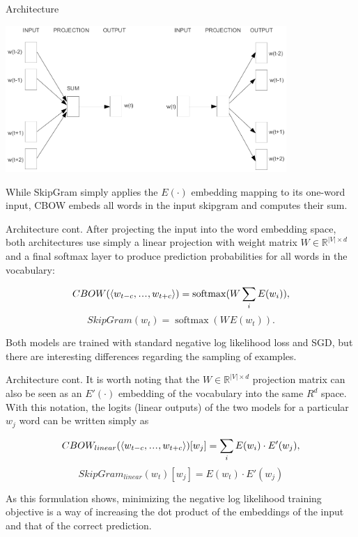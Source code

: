 \documentclass[style=upen, size=14pt]{powerdot}
\DeclareMathOperator*{\softmax}{softmax}
\newcommand\varlist{,\makebox[1em][c]{.\hfil.\hfil.},}
\theoremstyle{definition}
\begin{document}
\begin{slide}[toc=Architecture]{Architecture}
  \begin{center}
    \includegraphics[width=0.8\textwidth]{figures/w2v_arch.eps}
  \end{center}
  While SkipGram simply applies the $E(\cdot)$ embedding mapping to its one-word
  input, CBOW embeds all words in the input skipgram and computes their sum.
\end{slide}

\begin{slide}[toc=]{Architecture cont.}
  After projecting the input into the word embedding space, both architectures
  use simply a linear projection with weight matrix
  $W \in \mathbb R^{|V|\times d}$ and a final softmax layer to produce
  prediction probabilities for all words in the vocabulary:
   
  \begin{small}
  $$
  CBOW(\langle w_{t-c}\varlist w_{t+c} \rangle) = \softmax(W\sum_{i}E(w_i)),
  $$
  $$
  SkipGram(w_t) = \softmax(W_{}E(w_t)).
  $$
  \end{small}

  Both models are trained with standard negative log likelihood loss and SGD,
  but there are interesting differences regarding the sampling of examples.
\end{slide}

\begin{slide}[toc=]{Architecture cont.}
  It is worth noting that the $W \in \mathbb R^{|V|\times d}$ projection matrix
  can also be seen as an $E'(\cdot)$ embedding of the vocabulary into the same
  $R^d$ space. With this notation, the logits (linear outputs) of the two
  models for a particular $w_j$ word can be written simply as
  \begin{small}
  $$
  CBOW_{linear}(\langle w_{t-c}\varlist w_{t+c} \rangle)[w_j] = \sum_{i}E(w_i) \cdot E'(w_j),
  $$
  $$
  SkipGram_{linear}(w_t)[w_j] = E(w_t) \cdot E'(w_j)
  $$
\end{small}
As this formulation shows, minimizing the negative log likelihood training
objective is a way of increasing the dot product of the embeddings of the input
and that of the correct prediction.
\end{slide}
\end{document}
